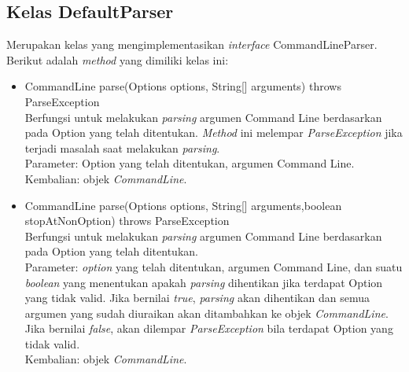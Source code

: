 \subsection{Kelas DefaultParser}
\label{subsec:defaultparser}
Merupakan kelas yang mengimplementasikan \textit{interface} CommandLineParser. Berikut adalah \textit{method} yang dimiliki kelas ini:
\begin{itemize}
\item CommandLine parse(Options options, String[] arguments) throws ParseException\\
Berfungsi untuk melakukan \textit{parsing} argumen Command Line berdasarkan pada Option yang telah ditentukan. \textit{Method} ini melempar \textit{ParseException} jika terjadi masalah saat melakukan \textit{parsing}.\\
Parameter: Option yang telah ditentukan, argumen Command Line.\\
Kembalian: objek \textit{CommandLine}.

\item CommandLine parse(Options options, String[] arguments,boolean stopAtNonOption) throws ParseException\\
Berfungsi untuk melakukan \textit{parsing} argumen Command Line berdasarkan pada Option yang telah ditentukan.\\
Parameter: \textit{option} yang telah ditentukan, argumen Command Line, dan suatu \textit{boolean} yang menentukan apakah \textit{parsing} dihentikan jika terdapat Option yang tidak valid. Jika bernilai \textit{true}, \textit{parsing} akan dihentikan dan semua argumen yang sudah diuraikan akan ditambahkan ke objek \textit{CommandLine}. Jika bernilai \textit{false}, akan dilempar \textit{ParseException} bila terdapat Option yang tidak valid.\\
Kembalian: objek \textit{CommandLine}.
\end{itemize}

